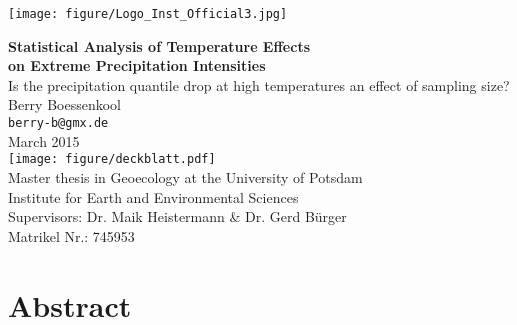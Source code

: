 \documentclass[a4paper]{article}
\newcommand{\todo}[1]{\emph{\textcolor{red}{#1}}}
\begin{document}
\thispagestyle{empty}
\begin{flushright}
\texttt{[image: figure/Logo\_Inst\_Official3.jpg]}\\[1em]
\end{flushright}
\begin{center}
\LARGE
\textbf{Statistical Analysis of Temperature Effects\\on Extreme Precipitation Intensities}\\[1em]
\large
Is the precipitation quantile drop at high temperatures an effect of sampling size?\\[2em]
Berry Boessenkool\\[0.5em] 
\texttt{berry-b@gmx.de}\\[0.5em]
March 2015\\
\vspace{2em}
\texttt{[image: figure/deckblatt.pdf]}\\
\vspace{3em}
Master thesis in Geoecology at the University of Potsdam\\
Institute for Earth and Environmental Sciences\\
Supervisors: Dr. Maik Heistermann \& Dr. Gerd Bürger\\
Matrikel Nr.: 745953\\
\normalsize 

\end{center}%


\pagebreak

\hypertarget{Abstract}{}
\section*{Abstract} %
\end{document}
